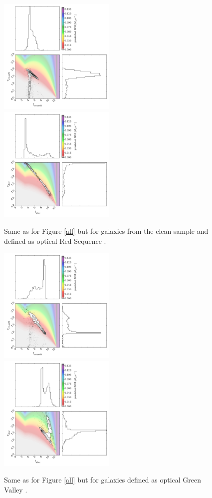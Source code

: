 \documentclass{mn2e}
\begin{document}
\begin{figure}
\includegraphics[width=0.4975\textwidth]{red_s_smooth_clean_new.pdf}
\includegraphics[width=0.4975\textwidth]{red_s_disc_clean_new.pdf}
\caption{Same as for Figure \ref{all} but for galaxies from the clean sample and defined as optical Red Sequence \cite{Baldry}.}
\label{red_s_clean}
\end{figure}

\begin{figure}
\includegraphics[width=0.4975\textwidth]{gv_smooth.pdf}
\includegraphics[width=0.4975\textwidth]{gv_disc.pdf}
\caption{Same as for Figure \ref{all} but for galaxies defined as optical Green Valley \cite{Baldry}.}
\label{gv}
\end{figure}
\end{document}
